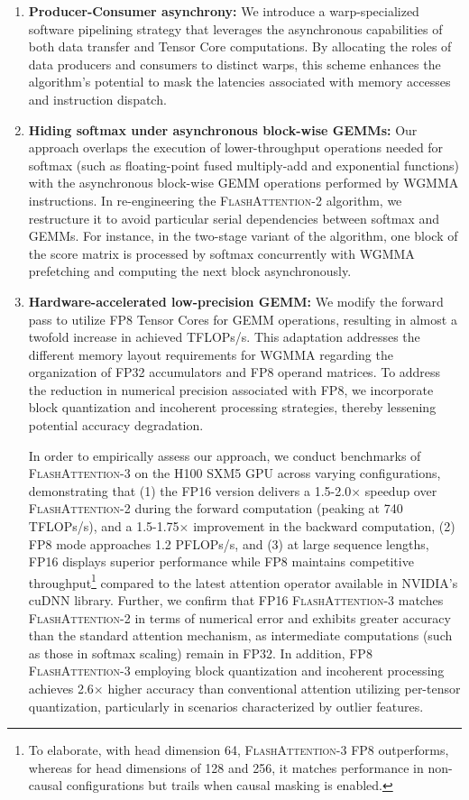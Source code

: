 \begin{enumerate}

\item \textbf{Producer-Consumer asynchrony:} We introduce a warp-specialized software pipelining strategy that leverages the asynchronous capabilities of both data transfer and Tensor Core computations. By allocating the roles of data producers and consumers to distinct warps, this scheme enhances the algorithm’s potential to mask the latencies associated with memory accesses and instruction dispatch.

\item \textbf{Hiding softmax under asynchronous block-wise GEMMs:} Our approach overlaps the execution of lower-throughput operations needed for softmax (such as floating-point fused multiply-add and exponential functions) with the asynchronous block-wise GEMM operations performed by WGMMA instructions. In re-engineering the \textsc{FlashAttention-2} algorithm, we restructure it to avoid particular serial dependencies between softmax and GEMMs. For instance, in the two-stage variant of the algorithm, one block of the score matrix is processed by softmax concurrently with WGMMA prefetching and computing the next block asynchronously.

\item \textbf{Hardware-accelerated low-precision GEMM:} We modify the forward pass to utilize FP8 Tensor Cores for GEMM operations, resulting in almost a twofold increase in achieved TFLOPs/s. This adaptation addresses the different memory layout requirements for WGMMA regarding the organization of FP32 accumulators and FP8 operand matrices. To address the reduction in numerical precision associated with FP8, we incorporate block quantization and incoherent processing strategies, thereby lessening potential accuracy degradation.

In order to empirically assess our approach, we conduct benchmarks of \textsc{FlashAttention-3} on the H100 SXM5 GPU across varying configurations, demonstrating that (1) the FP16 version delivers a 1.5-2.0$\times$ speedup over \textsc{FlashAttention-2} during the forward computation (peaking at 740 TFLOPs/s), and a 1.5-1.75$\times$ improvement in the backward computation, (2) FP8 mode approaches 1.2 PFLOPs/s, and (3) at large sequence lengths, FP16 displays superior performance while FP8 maintains competitive throughput\footnote{To elaborate, with head dimension 64, \textsc{FlashAttention-3} FP8 outperforms, whereas for head dimensions of 128 and 256, it matches performance in non-causal configurations but trails when causal masking is enabled.} compared to the latest attention operator available in NVIDIA’s cuDNN library. Further, we confirm that FP16 \textsc{FlashAttention-3} matches \textsc{FlashAttention-2} in terms of numerical error and exhibits greater accuracy than the standard attention mechanism, as intermediate computations (such as those in softmax scaling) remain in FP32. In addition, FP8 \textsc{FlashAttention-3} employing block quantization and incoherent processing achieves 2.6$\times$ higher accuracy than conventional attention utilizing per-tensor quantization, particularly in scenarios characterized by outlier features.


\end{enumerate}
